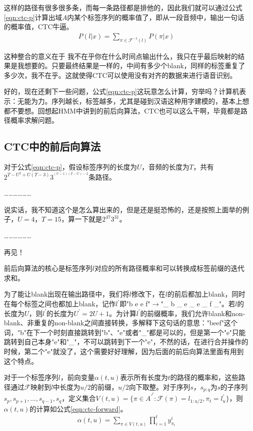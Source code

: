 这样的路径有很多很多条，而每一条路径都是排他的，因此我们就可以通过公式\ref{eqn:ctc-p}计算出域$A$内某个标签序列的概率值了，即从一段音频中，输出一句话的概率值，CTC牛逼。
\begin{align}
\label{eqn:ctc-p}
  P(l|x) = \sum_{\pi\in{\mathcal{F}^{-1}(l)}}P(\pi|x)
\end{align}

这种整合的意义在于 我不在乎你在什么时间点输出什么，我只在乎最后映射的结果是我想要的。只要最终结果是一样的，中间有多少个blank，同样的标签重复了多少次，我不在乎。这就使得CTC可以使用没有对齐的数据来进行语音识别。

好的，现在还剩下一些问题，公式\ref{eqn:ctc-p}这玩意怎么计算，穷举吗？计算机表示：无能为力。序列越长，标签越多，尤其是碰到汉语这种用字建模的，基本上想都不要想。回想起HMM中讲到的前后向算法，CTC也可以这么干啊，毕竟都是路径概率求解问题。

\subsection{CTC中的前后向算法}
对于公式\ref{eqn:ctc-p}，假设标签序列的长度为$U$，音频的长度为$T$，共有$2^{T-U^{2}+U(T-3)}3^{^{(U-1)(T-U)-2}}$条路径。

………………

说实话，我不知道这个是怎么算出来的，但是还是挺恐怖的，还是按照上面举的例子，$U=4$，$T=15$，算一下就是$2^{47}3^{31}$。

………………

再见！

前后向算法的核心是标签序列$l$对应的所有路径概率和可以转换成标签前缀的迭代求和。

为了能让blank出现在输出路径中，我们将$l$修改下，在$l$的前后都加上blank，同时在每个标签之间也都加上blank，记作$l^{'}$即"b e e f"$\longrightarrow$"\_ b \_ e \_ e \_ f \_"。若$l$的长度为$U$，则$l^{'}$的长度为$U^{'}=2U+1$。为计算$l^{'}$的前缀概率，我们允许blank和non-blank、非重复的non-blank之间直接转换，多解释下这句话的意思："beef"这个词，"b"在下一个时刻直接跳转到"b"、"e"或者"\_"都是可以的，但是第一个"e"只能跳转到自己本身"e"和"\_"，不可以跳转到下一个"e"，不然的话，在进行合并操作的时候，第二个"e"就没了，这个需要好好理解，因为后面的前后向算法里面有用到这个特点。

对于一个标签序列$l$，前向变量$\alpha(t,u)$表示所有长度为$t$的路径的概率和，这些路径通过$\mathcal{F}$映射到$l$中长度为$u/2$的前缀，$u/2$向下取整。对于序列$s$，$s_{p:q}$为$s$的子序列${s_p, s_{p+1}, ..., s_{q-1}, s_q}$，定义集合$V(t,u)=\{\pi\in{A^{'^{t}}}:\mathcal{F}(\pi)=l_{1:{u/2}}, \pi_{t}=l_{u}^{'}\}$，则$\alpha(t,u)$的计算如公式\ref{eqn:ctc-forward}。
\begin{align}
\label{eqn:ctc-forward}
  \alpha(t,u) = \sum_{\pi\in{V(t,u)}} \prod_{i=1}^{t}y_{\pi_i}^{i}
\end{align}

